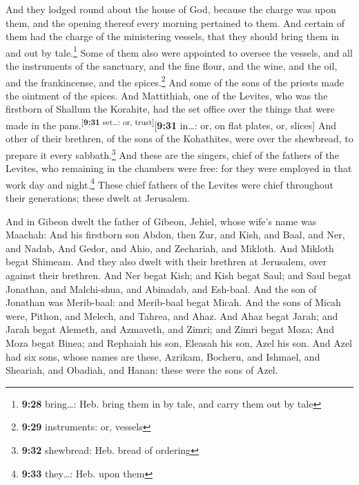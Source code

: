  And they lodged round about the house of God, because
the charge was upon them, and the opening thereof every morning
pertained to them.  And certain of them had the charge of
the ministering vessels, that they should bring them in and out by
tale.\footnote{\textbf{9:28} bring\ldots: Heb. bring them in by tale,
  and carry them out by tale}  Some of them also were
appointed to oversee the vessels, and all the instruments of the
sanctuary, and the fine flour, and the wine, and the oil, and the
frankincense, and the spices.\footnote{\textbf{9:29} instruments: or,
  vessels}  And some of the sons of the priests made the
ointment of the spices.  And Mattithiah, one of the
Levites, who was the firstborn of Shallum the Korahite, had the set
office over the things that were made in the
pans.\textsuperscript{{[}\textbf{9:31} set\ldots: or,
trust{]}}{[}\textbf{9:31} in\ldots: or, on flat plates, or, slices{]}
 And other of their brethren, of the sons of the
Kohathites, were over the shewbread, to prepare it every
sabbath.\footnote{\textbf{9:32} shewbread: Heb. bread of ordering}
 And these are the singers, chief of the fathers of the
Levites, who remaining in the chambers were free: for they were employed
in that work day and night.\footnote{\textbf{9:33} they\ldots: Heb. upon
  them}  These chief fathers of the Levites were chief
throughout their generations; these dwelt at Jerusalem.

 And in Gibeon dwelt the father of Gibeon, Jehiel, whose
wife's name was Maachah:  And his firstborn son Abdon,
then Zur, and Kish, and Baal, and Ner, and Nadab,  And
Gedor, and Ahio, and Zechariah, and Mikloth.  And Mikloth
begat Shimeam. And they also dwelt with their brethren at Jerusalem,
over against their brethren.  And Ner begat Kish; and
Kish begat Saul; and Saul begat Jonathan, and Malchi-shua, and Abinadab,
and Esh-baal.  And the son of Jonathan was Merib-baal:
and Merib-baal begat Micah.  And the sons of Micah were,
Pithon, and Melech, and Tahrea, and Ahaz.  And Ahaz begat
Jarah; and Jarah begat Alemeth, and Azmaveth, and Zimri; and Zimri begat
Moza;  And Moza begat Binea; and Rephaiah his son,
Eleasah his son, Azel his son.  And Azel had six sons,
whose names are these, Azrikam, Bocheru, and Ishmael, and Sheariah, and
Obadiah, and Hanan: these were the sons of Azel.


